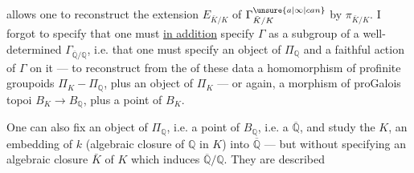 allows one to reconstruct the extension $E_{\bar K/K}$ of $\Gamma^{\unsure{a|\infty|can}}_{\bar K/K}$ by $\pi_{\bar K/K}$. I forgot to specify that one must \uline{in addition} specify $\Gamma$ as a subgroup of a well-determined $\Gamma_{\overline{\mathbb Q}/\mathbb Q}$, i.e. that one must specify an object of $\Pi_{\mathbb Q}$ and a faithful action of $\Gamma$ on it --- to reconstruct from the  of these data a homomorphism of profinite groupoids $\Pi_K-\Pi_{\mathbb Q}$, plus an object of $\Pi_K$ --- or again, a morphism of proGalois topoi $B_K\longrightarrow B_{\mathbb Q}$, plus a point of $B_K$.

One can also fix an object of $\Pi_{\mathbb Q}$, i.e. a point of $B_{\mathbb Q}$, i.e. a $\overline{\mathbb Q}$, and study the $K$,  an embedding of $k$ (algebraic closure of $\mathbb Q$ in $K$) into $\overline{\mathbb Q}$ ---  but without specifying an algebraic closure $\bar K$ of $K$ which induces $\overline{\mathbb Q}/\mathbb Q$. They are described
